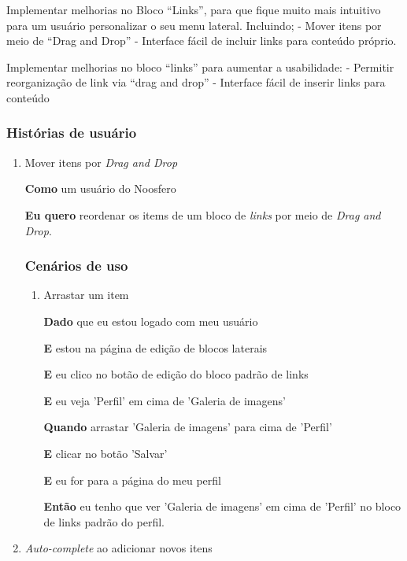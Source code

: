 
Implementar melhorias no Bloco ``Links'', para que fique muito mais intuitivo para um usuário personalizar o seu menu lateral. Incluindo;
- Mover itens por meio de ``Drag and Drop''
- Interface fácil de incluir links para conteúdo próprio.

Implementar melhorias no bloco ``links'' para aumentar a usabilidade:
  - Permitir reorganização de link via ``drag and drop''
  - Interface fácil de inserir links para conteúdo

\subsubsection*{Histórias de usuário}

\begin{enumerate}

\item Mover itens por \textit{Drag and Drop}

\textbf{Como} um usuário do Noosfero

\textbf{Eu quero} reordenar os items de um bloco de \textit{links} por meio de
\textit{Drag and Drop}.

\subsubsection*{Cenários de uso}

\begin{enumerate}

\item Arrastar um item

\textbf{Dado} que eu estou logado com meu usuário

\textbf{E} estou na página de edição de blocos laterais

\textbf{E} eu clico no botão de edição do bloco padrão de links

\textbf{E} eu veja 'Perfil' em cima de 'Galeria de imagens'

\textbf{Quando} arrastar 'Galeria de imagens' para cima de 'Perfil'

\textbf{E} clicar no botão 'Salvar'

\textbf{E} eu for para a página do meu perfil

\textbf{Então} eu tenho que ver 'Galeria de imagens' em cima de 'Perfil'
no bloco de links padrão do perfil.

\end{enumerate}

\item \textit{Auto-complete} ao adicionar novos itens

\end{enumerate}



